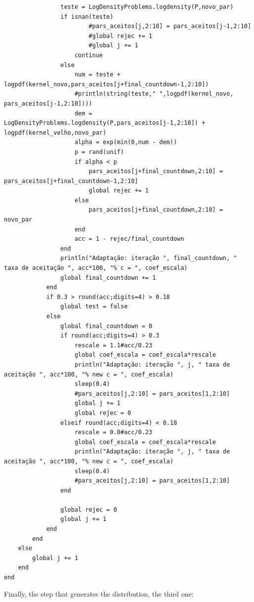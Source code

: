 \documentclass[12pt,a4paper]{article}
\begin{document}
\begin{verbatim}
                teste = LogDensityProblems.logdensity(P,novo_par)
                if isnan(teste)
                        #pars_aceitos[j,2:10] = pars_aceitos[j-1,2:10]
                        #global rejec += 1
                        #global j += 1
                    continue
                else
                    num = teste + logpdf(kernel_novo,pars_aceitos[j+final_countdown-1,2:10])
                    #println(string(teste," ",logpdf(kernel_novo, pars_aceitos[j-1,2:10])))
                    dem = LogDensityProblems.logdensity(P,pars_aceitos[j-1,2:10]) + logpdf(kernel_velho,novo_par)
                    alpha = exp(min(0,num - dem))
                    p = rand(unif)
                    if alpha < p
                        pars_aceitos[j+final_countdown,2:10] = pars_aceitos[j+final_countdown-1,2:10]
                        global rejec += 1
                    else
                        pars_aceitos[j+final_countdown,2:10] = novo_par
                    end
                    acc = 1 - rejec/final_countdown
                end
                println("Adaptação: iteração ", final_countdown, " taxa de aceitação ", acc*100, "% c = ", coef_escala)
                global final_countdown += 1
            end
            if 0.3 > round(acc;digits=4) > 0.18
                global test = false
            else
                global final_countdown = 0
                if round(acc;digits=4) > 0.3
                    rescale = 1.1#acc/0.23
                    global coef_escala = coef_escala*rescale
                    println("Adaptação: iteração ", j, " taxa de aceitação ", acc*100, "% new c = ", coef_escala)
                    sleep(0.4)
                    #pars_aceitos[j,2:10] = pars_aceitos[1,2:10]
                    global j += 1
                    global rejec = 0
                elseif round(acc;digits=4) < 0.18
                    rescale = 0.8#acc/0.23
                    global coef_escala = coef_escala*rescale
                    println("Adaptação: iteração ", j, " taxa de aceitação ", acc*100, "% new c = ", coef_escala)
                    sleep(0.4)
                    #pars_aceitos[j,2:10] = pars_aceitos[1,2:10]
                end

                global rejec = 0
                global j += 1
            end
        end
    else
        global j += 1
    end
end

\end{verbatim}
Finally, the step that generates the distribution, the third one:
\end{document}
